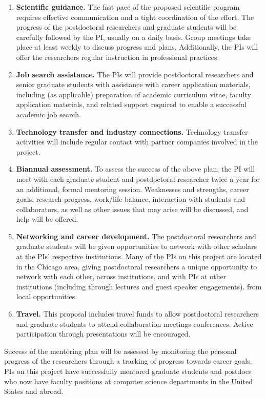 \begin{enumerate}
    \item {\bf Scientific guidance.} The fast pace of the proposed scientific
        program requires effective communication and a tight coordination of
        the effort.  The progress of the postdoctoral researchers and graduate
        students will be carefully followed by
        the PI, usually on a daily basis.  Group meetings take place at least
        weekly to discuss progress and plans. Additionally, the PIs will offer
        the researchers regular instruction in professional
        practices.

    \item {\bf Job search assistance.} The PIs will provide postdoctoral
        researchers and senior graduate students with assistance with career
        application materials, including (as
        applicable) preparation of academic curriculum vitae, faculty
        application materials, and related support required to enable a
        successful academic job search.

    \item {\bf Technology transfer and industry connections.} Technology
        transfer activities will include regular contact with partner
        companies involved in the project.  

    \item {\bf Biannual assessment.} To assess the success of the above plan,
        the PI will meet with each graduate student and postdoctoral
        researcher twice a year for an additional,
        formal mentoring session. Weaknesses and strengths, career goals, research
        progress, work/life balance, interaction with students and collaborators, as
        well as other issues that may arise will be discussed, and help will be
        offered.

    \item {\bf Networking and career development.} The postdoctoral
        researchers and graduate students will be given
        opportunities to network with other scholars at the PIs' respective
        institutions. Many of the PIs on this project are located in the Chicago area,
        giving postdoctoral researchers a unique opportunity to network with each
        other, across institutions, and with PIs at other institutions (including
        through lectures and guest speaker engagements).
from local opportunities.

\item {\bf Travel.} This proposal includes travel funds
    to allow postdoctoral researchers and graduate students to attend collaboration meetings conferences.  Active
participation through 
presentations will be encouraged.
\end{enumerate}
\noindent
Success of the mentoring plan will be assessed by monitoring the
personal progress of the researchers through a tracking of
progress towards career goals.
PIs on this project have successfully mentored graduate students and postdocs
who now have faculty
positions at computer science departments in the United States and abroad.

